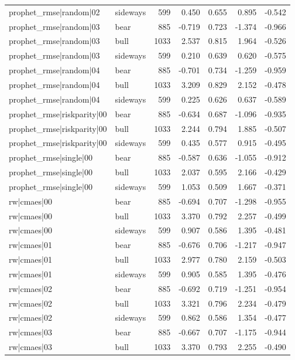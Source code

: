\begin{table}
\begin{tabular}{llrrrrr}
prophet\_rmse|random|02 & sideways & 599 & 0.450 & 0.655 & 0.895 & -0.542 \\
prophet\_rmse|random|03 & bear & 885 & -0.719 & 0.723 & -1.374 & -0.966 \\
prophet\_rmse|random|03 & bull & 1033 & 2.537 & 0.815 & 1.964 & -0.526 \\
prophet\_rmse|random|03 & sideways & 599 & 0.210 & 0.639 & 0.620 & -0.575 \\
prophet\_rmse|random|04 & bear & 885 & -0.701 & 0.734 & -1.259 & -0.959 \\
prophet\_rmse|random|04 & bull & 1033 & 3.209 & 0.829 & 2.152 & -0.478 \\
prophet\_rmse|random|04 & sideways & 599 & 0.225 & 0.626 & 0.637 & -0.589 \\
prophet\_rmse|riskparity|00 & bear & 885 & -0.634 & 0.687 & -1.096 & -0.935 \\
prophet\_rmse|riskparity|00 & bull & 1033 & 2.244 & 0.794 & 1.885 & -0.507 \\
prophet\_rmse|riskparity|00 & sideways & 599 & 0.435 & 0.577 & 0.915 & -0.495 \\
prophet\_rmse|single|00 & bear & 885 & -0.587 & 0.636 & -1.055 & -0.912 \\
prophet\_rmse|single|00 & bull & 1033 & 2.037 & 0.595 & 2.166 & -0.429 \\
prophet\_rmse|single|00 & sideways & 599 & 1.053 & 0.509 & 1.667 & -0.371 \\
rw|cmaes|00 & bear & 885 & -0.694 & 0.707 & -1.298 & -0.955 \\
rw|cmaes|00 & bull & 1033 & 3.370 & 0.792 & 2.257 & -0.499 \\
rw|cmaes|00 & sideways & 599 & 0.907 & 0.586 & 1.395 & -0.481 \\
rw|cmaes|01 & bear & 885 & -0.676 & 0.706 & -1.217 & -0.947 \\
rw|cmaes|01 & bull & 1033 & 2.977 & 0.780 & 2.159 & -0.503 \\
rw|cmaes|01 & sideways & 599 & 0.905 & 0.585 & 1.395 & -0.476 \\
rw|cmaes|02 & bear & 885 & -0.692 & 0.719 & -1.251 & -0.954 \\
rw|cmaes|02 & bull & 1033 & 3.321 & 0.796 & 2.234 & -0.479 \\
rw|cmaes|02 & sideways & 599 & 0.862 & 0.586 & 1.354 & -0.477 \\
rw|cmaes|03 & bear & 885 & -0.667 & 0.707 & -1.175 & -0.944 \\
rw|cmaes|03 & bull & 1033 & 3.370 & 0.793 & 2.255 & -0.490 \\

\end{tabular}
\end{table}

